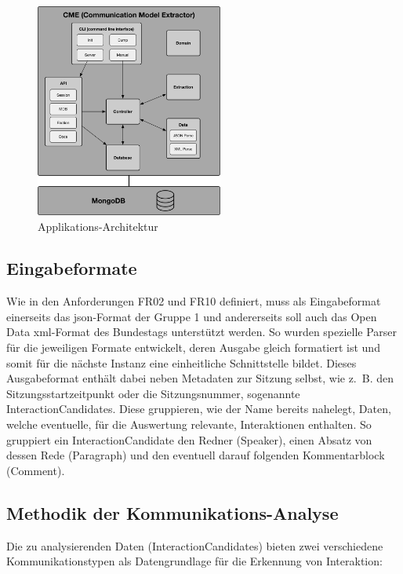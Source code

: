 \begin{figure}[!h]
    \begin{center}
        \includegraphics[width=0.55\textwidth]{images/03-cme/Project-Modules.pdf}
    \end{center}
    \caption{Applikations-Architektur}
    \label{fig:03_project_structure}
\end{figure}

\subsection{Eingabeformate}
Wie in den Anforderungen FR02 und FR10 definiert, muss als Eingabeformat
einerseits das \gls{json}-Format der Gruppe 1 und andererseits soll auch das
Open Data \gls{xml}-Format des Bundestags unterstützt werden. So wurden
spezielle Parser für die jeweiligen Formate entwickelt, deren Ausgabe gleich
formatiert ist und somit für die nächste Instanz eine einheitliche
Schnittstelle bildet. Dieses Ausgabeformat enthält dabei neben Metadaten zur
Sitzung selbst, wie z.~B. den Sitzungsstartzeitpunkt oder die Sitzungsnummer,
sogenannte InteractionCandidates. Diese gruppieren, wie der Name bereits
nahelegt, Daten, welche eventuelle, für die Auswertung relevante, Interaktionen
enthalten. So gruppiert ein InteractionCandidate den Redner (Speaker),
einen Absatz von dessen Rede (Paragraph) und den eventuell darauf folgenden
Kommentarblock (Comment).

\subsection{Methodik der Kommunikations-Analyse}
Die zu analysierenden Daten (InteractionCandidates) bieten zwei verschiedene
Kommunikationstypen als Datengrundlage für die Erkennung von Interaktion:

